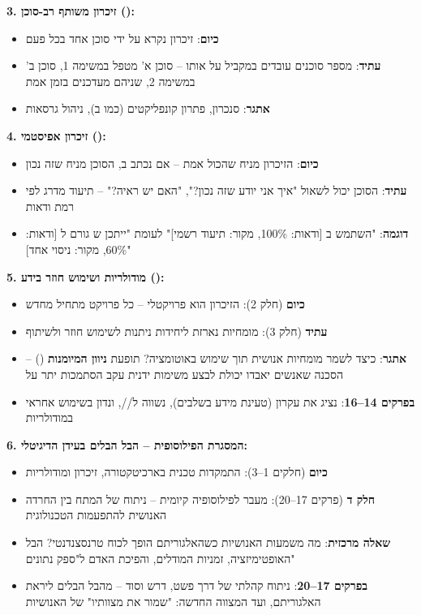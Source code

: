 \textbf{\num{3}. זיכרון משותף רב-סוכן ():}
\begin{itemize}
  \item \textbf{כיום}: זיכרון נקרא על ידי סוכן אחד בכל פעם
  \item \textbf{עתיד}: מספר סוכנים עובדים במקביל על אותו  – סוכן א' מטפל במשימה \num{1}, סוכן ב' במשימה \num{2}, שניהם מעדכנים בזמן אמת
  \item \textbf{אתגר}: סנכרון, פתרון קונפליקטים (כמו ב), ניהול גרסאות
\end{itemize}

\textbf{\num{4}. זיכרון אפיסטמי ():}
\begin{itemize}
  \item \textbf{כיום}: הזיכרון מניח שהכול אמת – אם נכתב ב, הסוכן מניח שזה נכון
  \item \textbf{עתיד}: הסוכן יכול לשאול "איך אני יודע שזה נכון?", "האם יש ראיה?" – תיעוד מדרג לפי רמת ודאות
  \item \textbf{דוגמה}: "השתמש ב [ודאות: \num{100}\%, מקור: תיעוד רשמי]" לעומת "ייתכן ש גורם ל [ודאות: \num{60}\%, מקור: ניסוי אחד]"
\end{itemize}

\textbf{\num{5}. מודולריות ושימוש חוזר בידע ():}
\begin{itemize}
  \item \textbf{כיום} (חלק \num{2}): הזיכרון הוא פרויקטלי – כל פרויקט מתחיל מחדש
  \item \textbf{עתיד} (חלק \num{3}): מומחיות נארזת ליחידות \textbf{} ניתנות לשימוש חוזר ולשיתוף
  \item \textbf{אתגר}: כיצד לשמר מומחיות אנושית תוך שימוש באוטומציה? תופעת \textbf{ניוון המיומנות} () – הסכנה שאנשים יאבדו יכולת לבצע משימות ידנית עקב הסתמכות יתר על 
  \item \textbf{בפרקים \num{14}–\num{16}}: נציג את עקרון  (טעינת מידע בשלבים), נשווה  ל//, ונדון בשימוש אחראי במודולריות
\end{itemize}

\textbf{\num{6}. המסגרת הפילוסופית – הבל הבלים בעידן הדיגיטלי:}
\begin{itemize}
  \item \textbf{כיום} (חלקים \num{1}–\num{3}): התמקדות טכנית בארכיטקטורה, זיכרון ומודולריות
  \item \textbf{חלק ד} (פרקים \num{17}–\num{20}): מעבר לפילוסופיה קיומית – ניתוח של המתח בין החרדה האנושית להתפעמות הטכנולוגית
  \item \textbf{שאלה מרכזית}: מה משמעות האנושיות כשהאלגוריתם הופך לכוח טרנסצנדנטי? הבל האופטימיזציה, זמניות המודלים, והפיכת האדם ל"ספק נתונים"
  \item \textbf{בפרקים \num{17}–\num{20}}: ניתוח קהלתי של  דרך פשט, דרש וסוד – מהבל הבלים ליראת האלגוריתם, ועד המצווה החדשה: "שמור את מצוותיו" של האנושיות
\end{itemize}

